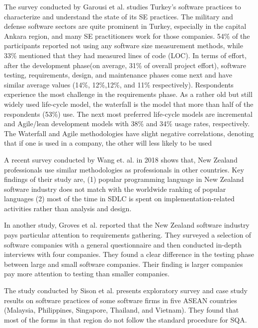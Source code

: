 The survey conducted by Garousi et al.\cite{Garousi2015} studies Turkey's software practices to characterize and understand the state of its SE practices. The military and defense software sectors are quite prominent in Turkey, especially in the capital Ankara region, and many SE practitioners work for those companies. 54\% of the participants reported not using any software size measurement methods, while 33\% mentioned that they had measured lines of code (LOC). In terms of effort, after the development phase(on average, 31\% of overall project effort), software testing, requirements, design, and maintenance phases come next and have similar average values (14\%, 12\%,12\%, and 11\% respectively). Respondents experience the most challenge in the requirements phase. As a rather old but still widely used life-cycle model, the waterfall is the model that more than half of the respondents (53\%) use. The next most preferred life-cycle models are incremental and Agile/lean development models with 38\% and 34\% usage rates, respectively. The Waterfall and Agile methodologies have slight negative correlations, denoting that if one is used in a company, the other will less likely to be used


A recent survey conducted by Wang et. al.\cite{Wang2018} in 2018 shows that, New Zealand professionals use similar methodologies as professionals in other countries. Key findings of their study are, (1) popular programming language in New Zealand software industry does not match with the worldwide ranking of popular languages (2) most of the time in SDLC is spent on implementation-related activities rather than  analysis and design.

In another study, Groves et al.\cite{Groves2000} reported that the New Zealand software industry pays particular attention to requirements gathering. They surveyed a selection of software companies with a general questionnaire and then conducted in-depth interviews with four companies. They found a clear difference in the testing phase between large and small software companies. Their finding is larger companies pay more attention to testing than smaller companies.

The study conducted by Sison et al.\cite{Sison2006} presents exploratory survey and case study results on software practices of some software firms in five ASEAN countries (Malaysia, Philippines, Singapore, Thailand, and Vietnam). They found that most of the forms in that region do not follow the standard procedure for SQA.

